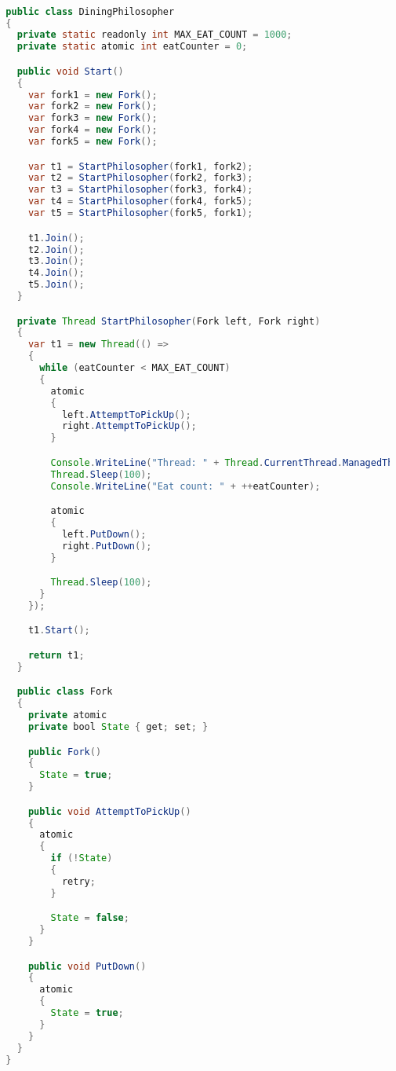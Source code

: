 \begin{lstlisting}[label=lst:impl_dining_lang,
  caption={\stmname Based Dining Philosophers Implementation},
  language=Java,  
  showspaces=false,
  showtabs=false,
  breaklines=true,
  showstringspaces=false,
  breakatwhitespace=true,
  commentstyle=\color{greencomments},
  keywordstyle=\color{bluekeywords},
  stringstyle=\color{redstrings},
  escapechar=~,
  morekeywords={atomic, retry, orelse, var, get, set, ref, out, readonly, virtual, override, region, endregion, foreach, lock}]  % Start your code-block

  public class DiningPhilosopher
  {
    private static readonly int MAX_EAT_COUNT = 1000;
    private static atomic int eatCounter = 0;

    public void Start()
    {
      var fork1 = new Fork();
      var fork2 = new Fork();
      var fork3 = new Fork();
      var fork4 = new Fork();
      var fork5 = new Fork();

      var t1 = StartPhilosopher(fork1, fork2);
      var t2 = StartPhilosopher(fork2, fork3);
      var t3 = StartPhilosopher(fork3, fork4);
      var t4 = StartPhilosopher(fork4, fork5);
      var t5 = StartPhilosopher(fork5, fork1);

      t1.Join();
      t2.Join();
      t3.Join();
      t4.Join();
      t5.Join();
    }

    private Thread StartPhilosopher(Fork left, Fork right)
    {
      var t1 = new Thread(() =>
      {
        while (eatCounter < MAX_EAT_COUNT)
        {
          atomic
          {
            left.AttemptToPickUp();
            right.AttemptToPickUp();
          }

          Console.WriteLine("Thread: " + Thread.CurrentThread.ManagedThreadId + " eating.");
          Thread.Sleep(100);
          Console.WriteLine("Eat count: " + ++eatCounter);

          atomic
          {
            left.PutDown();
            right.PutDown();
          }

          Thread.Sleep(100);
        }
      });

      t1.Start();

      return t1;
    }

    public class Fork
    {
      private atomic 
      private bool State { get; set; }

      public Fork()
      {
        State = true;
      }

      public void AttemptToPickUp()
      {
        atomic
        {
          if (!State)
          {
            retry;
          }

          State = false;
        }
      }

      public void PutDown()
      {
        atomic
        {
          State = true;
        }
      }
    }
  }

\end{lstlisting}
